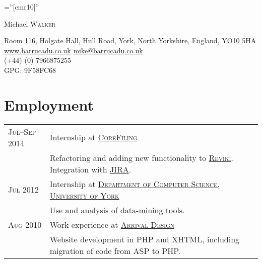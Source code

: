 \documentclass[a4paper,10pt]{article}
\newcommand{\schref}[2]{\href{#1}{\textsc{#2}}}
\newcommand{\mhref}[1]{\href{mailto:#1}{#1}}
\newcommand{\hhref}[1]{\href{http://#1}{#1}}
\newenvironment{cvtable}{\begin{tabular}{x{2cm}|p{11.6cm}}}{\end{tabular}}
\newcommand{\rowhead}[1]{\textsc{#1} &}
\newcommand{\rowdetail}[1]{& \footnotesize{#1}}
\begin{document}
\pagestyle{empty} %

\font\fb=''[cmr10]'' %

\par{\centering
		{\Huge Michael \textsc{Walker}
	}\bigskip\par}

{\centering
Room 116, Holgate Hall, Hull Road, York, North Yorkshire, England,
YO10 5HA\\
\hhref{www.barrucadu.co.uk} \mhref{mike@barrucadu.co.uk}\\
(+44) (0) 7966875255\\
GPG: 9F58FC68\\
}

\section{Employment}
\begin{cvtable}
  \rowhead{Jul--Sep 2014} Internship at \schref{http://www.corefiling.com/}{CoreFiling}\\
  \rowdetail{Refactoring and adding new functionality to \schref{https://github.com/CoreFiling/reviki}{Reviki}.
    Integration with \schref{https://www.atlassian.com/software/jira}{JIRA}.}\\

  \rowhead{Jul 2012} Internship at \schref{http://cs.york.ac.uk}{Department of Computer Science, University of York} \\
  \rowdetail{Use and analysis of data-mining tools.} \\

  \rowhead{Aug 2010} Work experience at \schref{http://www.arrivaldesign.co.uk/}{Arrival Design} \\
  \rowdetail{Website development in PHP and XHTML, including migration of code from ASP to PHP.}
\end{cvtable}
\end{document}
